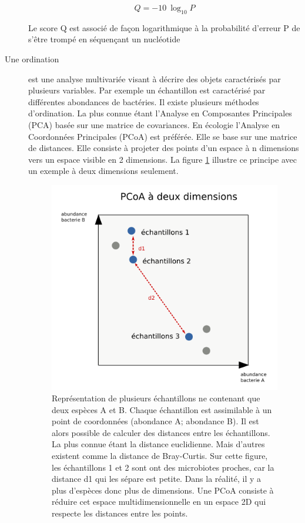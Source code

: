 \documentclass[12pt,a4paper]{article}
\begin{document}
\begin{description}
\begin{mycapequ}[!h]
   \begin{equation}
    Q = -10 \ \log_{10} P 
   \end{equation}
      \caption{Le score Q est associé de façon logarithmique à la probabilité d'erreur P de s'être trompé en séquençant un nucléotide}
\end{mycapequ}




\item[Une ordination] est une analyse multivariée visant à décrire des objets caractérisés par plusieurs variables. Par exemple un échantillon est caractérisé par différentes abondances de bactéries. Il existe plusieurs méthodes d'ordination. La plus connue étant l'Analyse en Composantes Principales (PCA) basée sur une matrice de covariances. En écologie l'Analyse en Coordonnées Principales (PCoA) est préférée. Elle se base sur une matrice de distances. Elle consiste à projeter des points d'un espace à n dimensions vers un espace visible en 2 dimensions.
La figure \ref{pcoatuto} illustre ce principe avec un exemple à deux dimensions seulement. 

\begin{figure}[!h]
\begin{center}
\includegraphics[scale=0.6]{img/pcoatuto.png}\hfill
\end{center}
\caption{Représentation de plusieurs échantillons ne contenant que deux espèces A et B. Chaque échantillon est assimilable à un point de coordonnées (abondance A; abondance B). Il est alors possible de calculer des distances entre les échantillons. La plus connue étant la distance euclidienne. Mais d'autres existent comme la distance de Bray-Curtis. Sur cette figure, les échantillons 1 et 2 sont ont des microbiotes proches, car la distance d1 qui les sépare est petite. Dans la réalité, il y a plus d'espèces donc plus de dimensions. Une PCoA consiste à réduire cet espace multidimensionnelle en un espace 2D qui respecte les distances entre les points. }
\label{pcoatuto}
\end{figure}
\newpage


\end{description}
\end{document}
